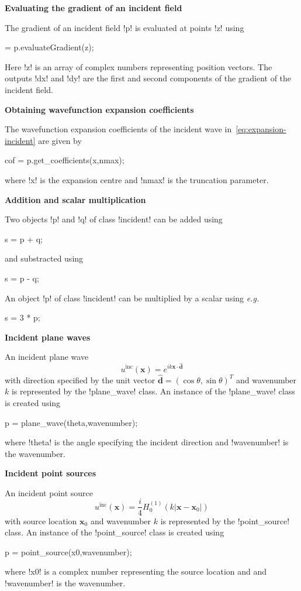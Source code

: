 \documentclass[11pt,letterpaper]{article}
\newcommand{\x}{\boldsymbol{x}}
\newcommand{\dd}{\boldsymbol{d}}
\newcommand{\hdd}{\widehat{\dd}}
\newcommand{\inc}{\mathrm{inc}}
\newcommand{\eg}{{\em e.g.}}
\newcommand{\techheading}[1]{%
    \par\vspace{-0.3\parskip}\noindent\hspace{-1cm}\textbf{#1}%
    \par\vspace{-0.5\parskip}\noindent\nopagebreak\ignorespaces}
\begin{document}
\techheading{Evaluating the gradient of an incident field}
The gradient of an incident field !p! is evaluated at points !z! using
\begin{matlab}
[dx,dy] = p.evaluateGradient(z);
\end{matlab}
Here !z! is an array of complex numbers representing position vectors.
The outputs !dx! and !dy! are the first and second components of
the gradient of the incident field.

\techheading{Obtaining wavefunction expansion coefficients}
The wavefunction expansion coefficients of the incident wave
in~\eqref{eq:expansion-incident}
are given by
\begin{matlab}
cof = p.get_coefficients(x,nmax);
\end{matlab}
where !x! is the expansion centre and !nmax! is the truncation
parameter.

\techheading{Addition and scalar multiplication}
Two objects !p! and !q! of class !incident! can be added using
\begin{matlab}
s = p + q;
\end{matlab}
and substracted using
\begin{matlab}
s = p - q;
\end{matlab}

An object !p! of class !incident! can be multiplied by a scalar using \eg{}
\begin{matlab}
s = 3 * p;
\end{matlab}

\techheading{Incident plane waves}
An incident plane wave
\begin{equation}
  \label{eq:plane-wave}
  u^{\inc}(\x) = e^{i k \x \cdot \hdd}
\end{equation}
with direction specified by the
unit vector $\hdd = (\cos \theta, \sin \theta)^T$
and wavenumber $k$ is represented by the
!plane_wave! class.
An instance of the !plane_wave! class is created using
\begin{matlab}
p = plane_wave(theta,wavenumber);
\end{matlab}
where !theta! is the angle specifying the incident direction
and !wavenumber! is the wavenumber.

\techheading{Incident point sources}
An incident point source
\begin{equation}
  \label{eq:point-source}
  u^{\inc}(\x) = \frac{i}{4} H^{(1)}_0(k |\x - \x_0|)
\end{equation}
with source location $\x_0$
and wavenumber $k$ is represented by the
!point_source! class.
An instance of the !point_source! class is created using
\begin{matlab}
p = point_source(x0,wavenumber);
\end{matlab}
where !x0! is a complex number representing the source location and
and !wavenumber! is the wavenumber.
\end{document}
